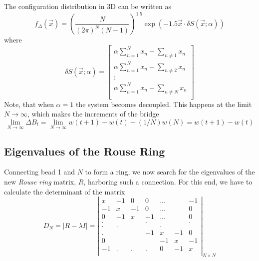 \documentclass{paper}
\begin{document}
The configuration distribution in 3D can be written as 
\begin{equation*}
f_\Delta(\vec{x})=\left(\frac{N}{(2\pi)^N (N-1)} \right)^{1.5}\exp(-1.5\vec{x}\cdot\delta S(\vec{x} ;\alpha))
\end{equation*}
where
\begin{equation*}
\delta S(\vec{x};\alpha)=\left[
\begin{matrix}
\alpha\sum_{n=1}^N x_n -\sum_{n\neq 1}x_n\\
\alpha\sum_{n=1}^N x_n -\sum_{n\neq 2}x_n\\
\colon\\
\alpha\sum_{n=1}^N x_n -\sum_{n\neq N}x_n\\
\end{matrix}
\right]
\end{equation*}
Note, that when $\alpha=1$ the system becomes decoupled. This happens at the limit $N\rightarrow \infty$, which makes the increments of the bridge 
\begin{equation*}
\lim_{N\rightarrow \infty} \Delta B_t=\lim_{N\rightarrow \infty} w(t+1)-w(t)-(1/N)w(N)= w(t+1)-w(t)
\end{equation*}

\subsection{Eigenvalues of the Rouse Ring}\label{subsection_eigenvaluesOfTheRouseRing}
Connecting bead 1 and $N$ to form a ring, we now search for the eigenvalues of the new \textit{Rouse ring} matrix, $R$, harboring such a connection. For this end, we have to calculate the determinant of the matrix
\begin{equation*}
D_N=|R-\lambda I|=\left|
\begin{matrix}
 x  & -1 &  0 &  0 &...&   & -1 \\
-1  &  x & -1 &  0 &...&   &  0 \\
 0  & -1 &  x & -1 &...&   &  0 \\
 .  &    &    &  . &   &   &  . \\
  . &   .&    &    &  .&   & \\
 .  &    &    & -1 & x &-1 & 0 \\
 0  &    &    &    & -1& x & -1 \\
 -1 &   .&  . & .  &  0&-1 &  x \\     
\end{matrix}
\right|_{N\times N}
\end{equation*}
\end{document}

